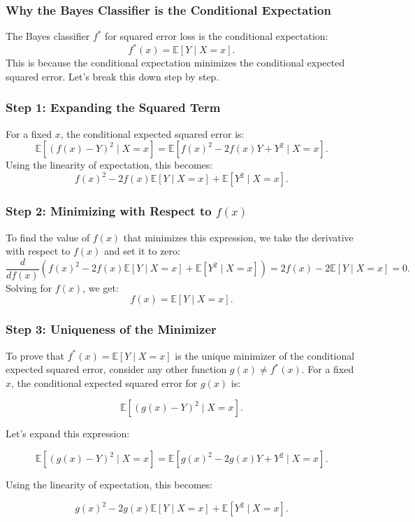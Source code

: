 \begin{notechapter}
\subsubsection{Why the Bayes Classifier is the Conditional Expectation}
The Bayes classifier \( f^* \) for squared error loss is the conditional expectation:
\[
f^*(x) = \mathbb{E}[Y \mid X = x].
\]
This is because the conditional expectation minimizes the conditional expected squared error. Let's break this down step by step.

\subsubsection{Step 1: Expanding the Squared Term}
For a fixed \( x \), the conditional expected squared error is:
\[
\mathbb{E}[(f(x) - Y)^2 \mid X = x] = \mathbb{E}[f(x)^2 - 2f(x)Y + Y^2 \mid X = x].
\]
Using the linearity of expectation, this becomes:
\[
f(x)^2 - 2f(x)\mathbb{E}[Y \mid X = x] + \mathbb{E}[Y^2 \mid X = x].
\]

\subsubsection{Step 2: Minimizing with Respect to \( f(x) \)}
To find the value of \( f(x) \) that minimizes this expression, we take the derivative with respect to \( f(x) \) and set it to zero:
\[
\frac{d}{df(x)} \left( f(x)^2 - 2f(x)\mathbb{E}[Y \mid X = x] + \mathbb{E}[Y^2 \mid X = x] \right) = 2f(x) - 2\mathbb{E}[Y \mid X = x] = 0.
\]
Solving for \( f(x) \), we get:
\[
f(x) = \mathbb{E}[Y \mid X = x].
\]

\subsubsection{Step 3: Uniqueness of the Minimizer}

To prove that \( f^*(x) = \mathbb{E}[Y \mid X = x] \) is the unique minimizer of the conditional expected squared error, consider any other function \( g(x) \neq f^*(x) \). For a fixed \( x \), the conditional expected squared error for \( g(x) \) is:

\[
\mathbb{E}[(g(x) - Y)^2 \mid X = x].
\]

Let's expand this expression:

\[
\mathbb{E}[(g(x) - Y)^2 \mid X = x] = \mathbb{E}[g(x)^2 - 2g(x)Y + Y^2 \mid X = x].
\]

Using the linearity of expectation, this becomes:

\[
g(x)^2 - 2g(x)\mathbb{E}[Y \mid X = x] + \mathbb{E}[Y^2 \mid X = x].
\]


\end{notechapter}
